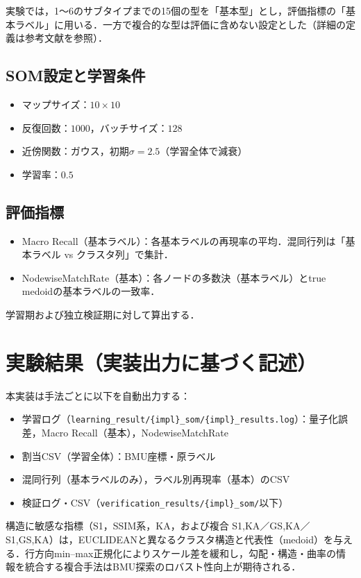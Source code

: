 \documentclass{jarticle}
\theoremstyle{definition}
\begin{document}
実験では，1〜6のサブタイプまでの15個の型を「基本型」とし，評価指標の「基本ラベル」に用いる．一方で複合的な型は評価に含めない設定とした（詳細の定義は参考文献\cite{吉野2002日本の気候}を参照）．

\subsection{SOM設定と学習条件}
\begin{itemize}
\item マップサイズ：$10\times 10$
\item 反復回数：$1000$，バッチサイズ：$128$
\item 近傍関数：ガウス，初期$\sigma=2.5$（学習全体で減衰）
\item 学習率：$0.5$
\end{itemize}

\subsection{評価指標}
\begin{itemize}
\item Macro Recall（基本ラベル）：各基本ラベルの再現率の平均．混同行列は「基本ラベル vs クラスタ列」で集計．
\item NodewiseMatchRate（基本）：各ノードの多数決（基本ラベル）とtrue medoidの基本ラベルの一致率．
\end{itemize}
学習期および独立検証期に対して算出する．

\section{実験結果（実装出力に基づく記述）}
本実装は手法ごとに以下を自動出力する：
\begin{itemize}
\item 学習ログ（\texttt{learning\_result/\{impl\}\_som/\{impl\}\_results.log}）：量子化誤差，Macro Recall（基本），NodewiseMatchRate
\item 割当CSV（学習全体）：BMU座標・原ラベル
\item 混同行列（基本ラベルのみ），ラベル別再現率（基本）のCSV
\item 検証ログ・CSV（\texttt{verification\_results/\{impl\}\_som/}以下）
\end{itemize}
構造に敏感な指標（S1，SSIM系，KA，および複合 S1,KA／GS,KA／S1,GS,KA）は，EUCLIDEANと異なるクラスタ構造と代表性（medoid）を与える．行方向min–max正規化によりスケール差を緩和し，勾配・構造・曲率の情報を統合する複合手法はBMU探索のロバスト性向上が期待される．
\end{document}
